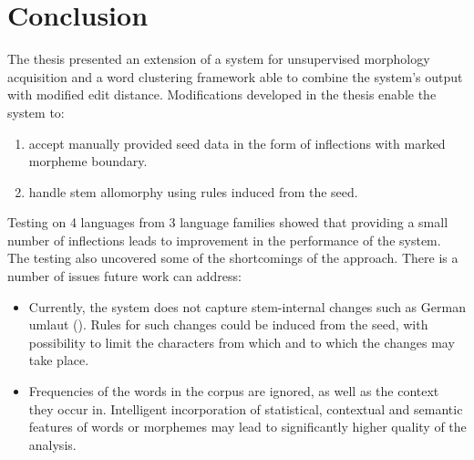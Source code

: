 \chapter{Conclusion}\label{chapter:conclusion}
The thesis presented an extension of a system for unsupervised morphology acquisition and a word clustering framework able to combine the system's output with modified edit distance. Modifications developed in the thesis enable the system to:
\begin{enumerate}
\item accept manually provided seed data in the form of inflections with marked morpheme boundary.
\item handle stem allomorphy using rules induced from the seed.
\end{enumerate} 

\noindent Testing on 4 languages from 3 language families showed that providing a small number of inflections leads to improvement in the performance of the system. The testing also uncovered some of the shortcomings of the approach. There is a number of issues future work can address:
\begin{itemize}
\item Currently, the system does not capture stem-internal changes such as German umlaut (). Rules for such changes could be induced from the seed, with possibility to limit the characters from which and to which the changes may take place.
\item Frequencies of the words in the corpus are ignored, as well as the context they occur in.
Intelligent incorporation of statistical, contextual and semantic features of words or morphemes may lead to significantly higher quality of the analysis.
\end{itemize}
